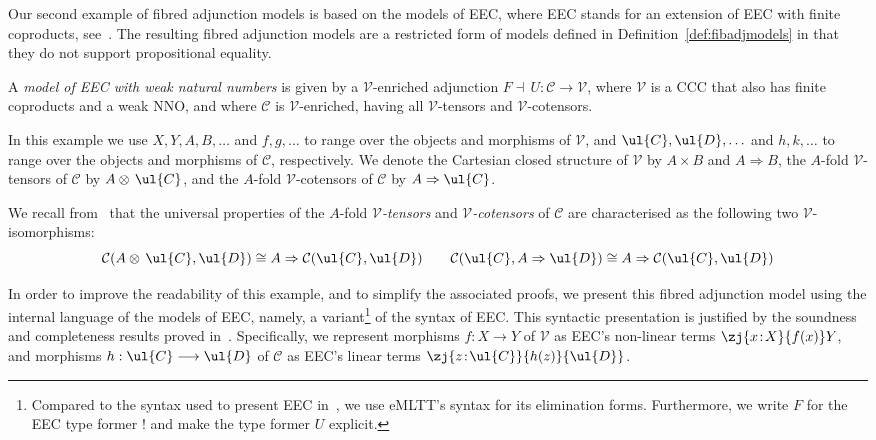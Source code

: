 Our second example of fibred adjunction models is based on the models of EEC\raisebox{0.75pt}{+}, where EEC\raisebox{0.75pt}{+} stands for an extension of EEC with finite coproducts, see~\cite[Definition~6.6]{Egger:EnrichedEffectCalculus}. The resulting fibred adjunction models are a restricted form of models defined in Definition~\ref{def:fibadjmodels} in that they do not support  propositional equality.

\begin{definition}
A \emph{model of EEC\raisebox{0.75pt}{+} with weak natural numbers} is given by a $\mathcal{V}$-enriched adjunction $F \dashv\, U : \mathcal{C} \longrightarrow \mathcal{V}$, where $\mathcal{V}$ is a CCC that also has finite coproducts and a weak NNO, and where $\mathcal{C}$ 
is $\mathcal{V}$-enriched, having all $\mathcal{V}$-tensors and $\mathcal{V}$-cotensors.
\end{definition}

In this example we use $X,Y,A,B,\ldots$ and $f,g,\ldots$ to range over the objects and morphisms of $\mathcal{V}$, and $\ul{C}, \ul{D}, \ldots$ and $h, k, \ldots$ to range over the objects and morphisms of $\mathcal{C}$, respectively. We denote the Cartesian closed structure of $\mathcal{V}$ by $A \times B$ and $A \Rightarrow B$, 
the $A$-fold $\mathcal{V}$-tensors of $\mathcal{C}$ by $A \otimes\, \ul{C}$, and the $A$-fold $\mathcal{V}$-cotensors of $\mathcal{C}$ by $A \Rightarrow \ul{C}$. 

We recall from~\cite{Kelly:EnrichedCats} that the universal properties of the $A$-fold \emph{$\mathcal{V}$-tensors} and \emph{$\mathcal{V}$-cotensors} of $\mathcal{C}$ are characterised as the following two $\mathcal{V}$-isomorphisms:
\[
\mathcal{C}(A \otimes\, \ul{C},\ul{D}) \cong A \Rightarrow \mathcal{C}(\ul{C},\ul{D})
\qquad
\mathcal{C}(\ul{C},A \Rightarrow \ul{D}) \cong A \Rightarrow \mathcal{C}(\ul{C},\ul{D})
\]

In order to improve the readability of this example, and to simplify the associated proofs, we present this fibred adjunction model using the internal language of the models of EEC\raisebox{0.75pt}{+}, namely, a variant\footnote{Compared to the syntax used to present EEC\raisebox{0.75pt}{+} in~\cite{Egger:EnrichedEffectCalculus}, we use eMLTT's syntax for its elimination forms. Furthermore, we write $F$ for the EEC type former $!$ and make the type former $U$ explicit.} of the syntax of EEC\raisebox{0.75pt}{+}.
This syntactic presentation is justified by the soundness and completeness results proved in~\cite[Theorem~7.1]{Egger:EnrichedEffectCalculus}. 
Specifically, we represent morphisms $f : X \longrightarrow Y$ of $\mathcal{V}$ as EEC\raisebox{0.75pt}{+}'s non-linear terms $\zj {x \!:\! X} {f(x)} Y$, and morphisms $h : \ul{C} \longrightarrow \ul{D}$ of $\mathcal{C}$ as EEC\raisebox{0.75pt}{+}'s linear terms $\zj {z \!:\! \ul{C}} {h(z)} {\ul{D}}$. 


